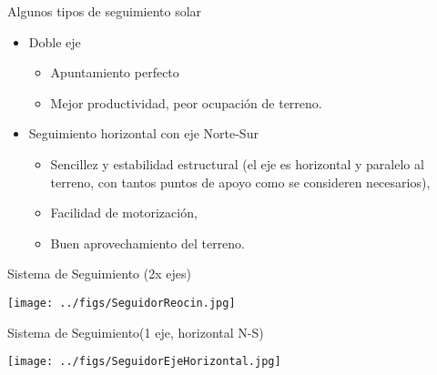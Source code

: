\documentclass[aspectratio=169, usenames,svgnames,dvipsnames]{beamer}
\begin{document}
\begin{frame}[label={sec:orgd72da2c}]{Algunos tipos de seguimiento solar}
\begin{itemize}
\item \alert{Doble eje}

\begin{itemize}
\item Apuntamiento \guillemotleft{}perfecto\guillemotright{}

\item Mejor productividad, peor ocupación de terreno.
\end{itemize}
\end{itemize}


\begin{itemize}
\item \alert{Seguimiento horizontal con eje Norte-Sur}

\begin{itemize}
\item Sencillez y estabilidad estructural (el eje es horizontal y
paralelo al terreno, con tantos puntos de apoyo como se consideren
necesarios),

\item Facilidad de motorización,

\item Buen aprovechamiento del terreno.
\end{itemize}
\end{itemize}
\end{frame}

\begin{frame}[label={sec:orgbe04945}]{Sistema de Seguimiento (2x ejes)}
\begin{center}
\texttt{[image: ../figs/SeguidorReocin.jpg]}
\end{center}
\end{frame}

\begin{frame}[label={sec:orgd1ed7c7}]{Sistema de Seguimiento(1 eje, horizontal N-S)}
\begin{center}
\texttt{[image: ../figs/SeguidorEjeHorizontal.jpg]}
\end{center}
\end{frame}
\end{document}
